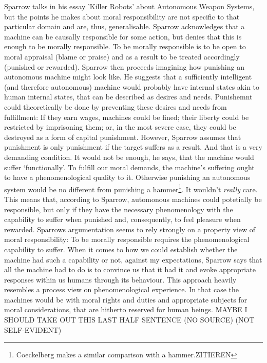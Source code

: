\documentclass{article}
\begin{document}
Sparrow talks in his essay 'Killer Robots' about Autonomous Weapon Systems, but the
points he makes about moral responsibility are not specific to that particular
domain and are, thus, generalisable. Sparrow acknowledges that a machine
can be causally responsible for some action, but denies that this is enough to
be morally responsible. To be morally responsible is to be open to moral appraisal
(blame or praise) and as a result to be treated accordingly (punished or
rewarded). Sparrow then proceeds imagining how punishing an autonomous machine
might look like. He suggests that a sufficiently intelligent (and therefore
autonomous) machine would probably have internal states akin to human internal
states, that can be described as desires and needs. Punishemnt could
theoretically be done by preventing these desires and needs from fulfillment: If
they earn wages, machines could be fined; their liberty could be restricted by
imprisoning them; or, in the most severe case, they could be destroyed as a form
of capital punishment. However, Sparrow assumes that punishment is only
punishment if the target suffers as a result. And that is a very demanding
condition. It would not be enough, he says, that the machine would suffer
`functionally'. To fulfill our moral demands, the machine's suffering ought to
have a phenomenological quality to it. Otherwise punishing an autonomous system
would be no different from punishing a hammer\footnote{Coeckelberg makes a
similar comparison with a hammer.ZITIEREN}. It wouldn't \textit{really} care.
This means that, according to Sparrow, automonous machines could potetially be
responsible, but only if they have the necessary phenomenology with the
capability to suffer when punished and, consequently, to feel pleasure when
rewarded. Sparrows argumentation seems to rely strongly on a property view of moral
responsibility: To be morally responsible requires the phenomenological
capability to suffer. When it comes to how we could establish whether the
machine had such a capability or not, against my expectations, Sparrow says that
all the machine had to do is to convince us that it had it and evoke appropriate
responses within us humans through its behaviour. This approach heavily
resembles a process view on phenomenological experience. In that case the
machines would be  with moral rights and duties and
appropriate subjects for moral considerations, that are hitherto reserved for
human beings. MAYBE I SHOULD TAKE OUT THIS LAST HALF SENTENCE (NO SOURCE) (NOT
SELF-EVIDENT)
\end{document}
